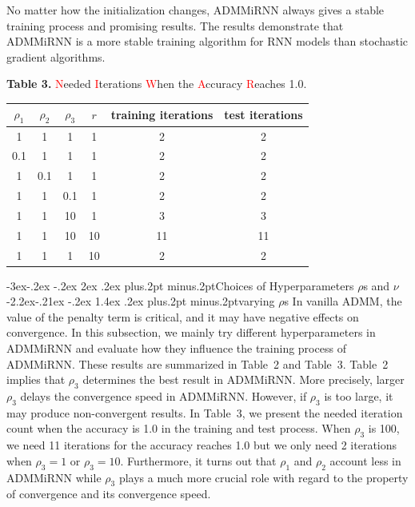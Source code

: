 \documentclass[twoside]{article}
\makeatletter
\def\subsection{\@startsection{subsection}{2}{\z@}%
 {-3ex\@plus -.2ex \@minus -.2ex}%
 {2ex \@plus.2ex}%
{\normalfont\normalsize\protect\baselineskip=12.5pt plus.2pt minus.2pt\bfseries}}
\def\subsubsection{\@startsection{subsubsection}{3}{\z@}%
 {-2.2ex\@plus -.21ex \@minus -.2ex}%
 {1.4ex \@plus.2ex}
{\normalfont\normalsize\protect\baselineskip=12pt plus.2pt minus.2pt\sl}}
\makeatother
\begin{document}
\begin{multicols}{2}
No matter how the initialization changes, ADMMiRNN always gives a stable training process and promising results.
The results demonstrate that ADMMiRNN is a more stable training algorithm for RNN models than stochastic gradient algorithms.
\tabcolsep 6pt
\renewcommand\arraystretch{1.3}
\begin{center}
{\footnotesize{\bf Table 3.} \textcolor{red}{N}eeded \textcolor{red}{I}terations \textcolor{red}{W}hen the \textcolor{red}{A}ccuracy \textcolor{red}{R}eaches 1.0.}\\
\vspace{2mm}
\footnotesize{
\begin{tabular*}{\linewidth}{cccccc}\hline\hline\hline
$\rho_1$ & $\rho_2$ & $\rho_3$ & $r$ & training iterations & test iterations  \\
\hline
1 & 1 & 1 & 1   &  2   & 2    \\
0.1 & 1 & 1 & 1 &  2   & 2    \\
1 & 0.1 & 1 & 1 &  2   & 2   \\
1 &1 & 0.1 & 1  &  2   & 2    \\
1 &1 & 10  & 1   &  3   & 3   \\
1 & 1 & 10 & 10   &  11   & 11    \\
1 & 1 & 1 & 10  &  2   & 2    \\    
\hline\hline\hline
\end{tabular*}%
}
\label{tab:hyper acc}
\end{center}
\subsection{Choices of Hyperparameters $\rho$s and $\nu$}
\subsubsection{varying $\rho$s}
In vanilla ADMM, the value of the penalty term is critical, and it may have negative effects on convergence.
In this subsection, we mainly try different hyperparameters in ADMMiRNN and evaluate how they influence the training process of ADMMiRNN. 
These results are summarized in Table~2 and Table~3.
Table~2 implies that $\rho_3$ determines the best result in ADMMiRNN.
More precisely, larger $\rho_3$ delays the convergence speed in ADMMiRNN.
However, if $\rho_3$ is too large, it may produce non-convergent results.
In Table~3, we present the needed iteration count when the accuracy is 1.0 in the training and test process.
When $\rho_3$ is 100, we need 11 iterations for the accuracy reaches 1.0 but we only need 2 iterations when $\rho_3=1$ or $\rho_3=10$.
Furthermore, it turns out that $\rho_1$ and $\rho_2$ account less in ADMMiRNN while $\rho_3$ plays a much more crucial role with regard to the property of convergence and its convergence speed.


\end{multicols}
\end{document}
